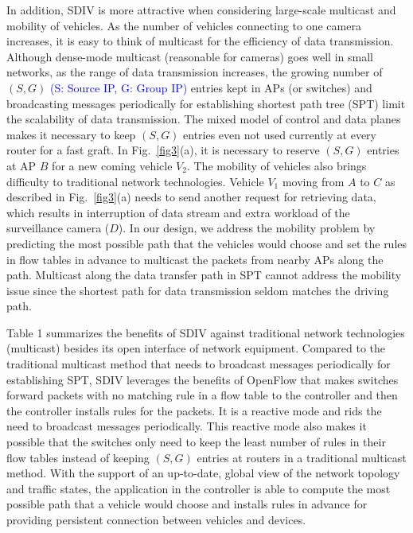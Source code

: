 \documentclass[journal]{IEEEtran}
\begin{document}
In addition, SDIV is more attractive when considering large-scale multicast and mobility of vehicles. As the number of vehicles connecting to one camera increases, it is easy to think of multicast for the efficiency of data transmission. Although dense-mode multicast (reasonable for cameras) goes well in small networks, as the range of data transmission increases, the growing number of $(S,G)$ \textcolor{blue}{(S: Source IP, G: Group IP)} entries kept in APs (or switches) and broadcasting messages periodically for establishing shortest path tree (SPT) limit the scalability of data transmission. The mixed model of control and data planes makes it necessary to keep $(S,G)$ entries even not used currently at every router for a fast graft. In Fig.~\ref{fig3}(a), it is necessary to reserve $(S,G)$ entries at AP $B$ for a new coming vehicle $V_{2}$. The mobility of vehicles also brings difficulty to traditional network technologies. Vehicle $V_{1}$ moving from $A$ to $C$ as described in Fig.~\ref{fig3}(a) needs to send another request for retrieving data, which results in interruption of data stream and extra workload of the surveillance camera ($D$). In our design, we address the mobility problem by predicting the most possible path that the vehicles would choose and set the rules in flow tables in advance to multicast the packets from nearby APs along the path. Multicast along the data transfer path in SPT cannot address the mobility issue since the shortest path for data transmission seldom matches the driving path.

Table 1 summarizes the benefits of SDIV against traditional network technologies (multicast) besides its open interface of network equipment. Compared to the traditional multicast method that needs to broadcast messages periodically for establishing SPT, SDIV leverages the benefits of OpenFlow that makes switches forward packets with no matching rule in a flow table to the controller and then the controller installs rules for the packets. It is a reactive mode and rids the need to broadcast messages periodically. This reactive mode also makes it possible that the switches only need to keep the least number of rules in their flow tables instead of keeping $(S,G)$ entries at routers in a traditional multicast method. With the support of an up-to-date, global view of the network topology and traffic states, the application in the controller is able to compute the most possible path that a vehicle would choose and installs rules in advance for providing persistent connection between vehicles and devices.
\end{document}
